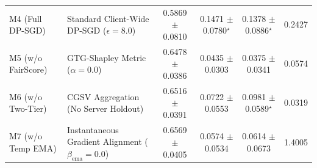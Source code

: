 \begin{table}[t]
{\begin{tabular}{llcccc}
M4 (Full DP-SGD) & Standard Client-Wide DP-SGD ($\epsilon=8.0$) & 0.5869 $\pm$ 0.0810 & 0.1471 $\pm$ 0.0780$^\star$ & 0.1378 $\pm$ 0.0886$^\star$ & 0.2427 \\
M5 (w/o FairScore) & GTG-Shapley Metric ($\alpha=0.0$) & 0.6478 $\pm$ 0.0386 & 0.0435 $\pm$ 0.0303 & 0.0375 $\pm$ 0.0341 & 0.0574 \\
M6 (w/o Two-Tier) & CGSV Aggregation (No Server Holdout) & 0.6516 $\pm$ 0.0391 & 0.0722 $\pm$ 0.0553 & 0.0981 $\pm$ 0.0589$^\star$ & 0.0319 \\
M7 (w/o Temp EMA) & Instantaneous Gradient Alignment ($\beta_{\text{ema}}=0.0$) & 0.6569 $\pm$ 0.0405 & 0.0574 $\pm$ 0.0534 & 0.0614 $\pm$ 0.0673 & 1.4005 \\
\bottomrule
\end{tabular}%
}
\end{table}
